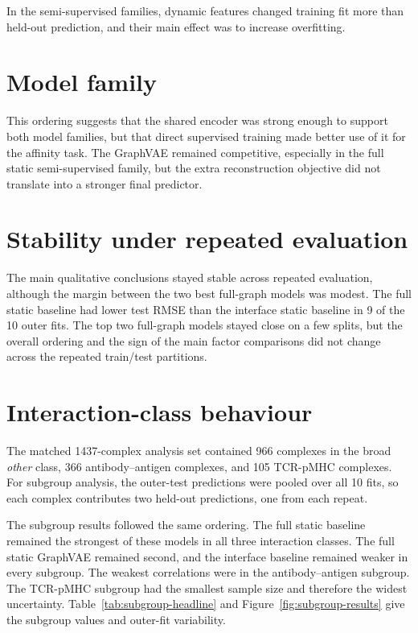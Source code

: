 In the semi-supervised families, dynamic features changed training fit more than held-out prediction, and their main effect was to increase overfitting.

\section{Model family}

This ordering suggests that the shared encoder was strong enough to support both model families, but that direct supervised training made better use of it for the affinity task. The GraphVAE remained competitive, especially in the full static semi-supervised family, but the extra reconstruction objective did not translate into a stronger final predictor.

\section{Stability under repeated evaluation}

The main qualitative conclusions stayed stable across repeated evaluation, although the margin between the two best full-graph models was modest. The full static baseline had lower test RMSE than the interface static baseline in 9 of the 10 outer fits. The top two full-graph models stayed close on a few splits, but the overall ordering and the sign of the main factor comparisons did not change across the repeated train/test partitions.

\section{Interaction-class behaviour}

The matched 1437-complex analysis set contained 966 complexes in the broad \emph{other} class, 366 antibody--antigen complexes, and 105 TCR-pMHC complexes. For subgroup analysis, the outer-test predictions were pooled over all 10 fits, so each complex contributes two held-out predictions, one from each repeat.

The subgroup results followed the same ordering. The full static baseline remained the strongest of these models in all three interaction classes. The full static GraphVAE remained second, and the interface baseline remained weaker in every subgroup. The weakest correlations were in the antibody--antigen subgroup. The TCR-pMHC subgroup had the smallest sample size and therefore the widest uncertainty. Table~\ref{tab:subgroup-headline} and Figure~\ref{fig:subgroup-results} give the subgroup values and outer-fit variability.

